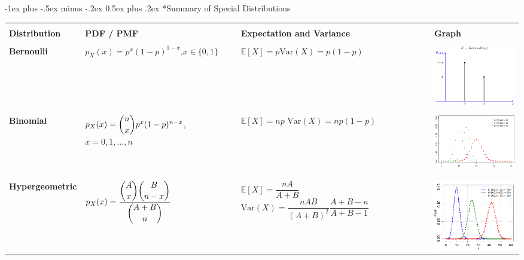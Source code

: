 \documentclass[a4paper,10pt,landscape]{article}
\makeatletter
\newcommand{\var}{\textrm{Var}}
\renewcommand{\section}{\@startsection{section}{1}{0mm}%
                                {-1ex plus -.5ex minus -.2ex}%
                                {0.5ex plus .2ex}%
                                {\normalfont\large\bfseries}}
\makeatother
\begin{document}
\section*{Summary of Special Distributions}
\begin{table}[h!]
	\begin{tabular}{| C{4.5cm} | C{7cm} | C{6cm} | C{7cm} |}
		\hline
		&&&\\
		{\bf Distribution} &
		{\bf PDF / PMF} & {\bf Expectation and Variance} & {\bf Graph} \\ 
		&&&\\ \hline
		{\bf Bernoulli} & $p_X(x)=p^x(1-p)^{1-x}$,\newline \vspace*{3pt}$x\in\{0,1\}$ & $\mathbb{E}[X]=p$\newline \vspace*{3pt}$\var(X)=p(1-p)$ & \includegraphics[width=3.75cm]{bernoulli.png}\\ \hline
		&&&\\
		{\bf Binomial} & $p_X(x)=\dbinom{n}{x}p^x(1-p)^{n-x}$, \newline\vspace*{5pt}$x=0,1,\dots,n$ & $\mathbb{E}[X]=np$ \newline\vspace*{3pt}$\var(X)=np(1-p)$ & \includegraphics[width=3.75cm]{binomial.png}\\
		&&&\\ \hline
		&&&\\
		{\bf Hypergeometric} & $p_X(x)=\dfrac{\dbinom{A}{x}\dbinom{B}{n-x}}{\dbinom{A+B}{n}}$& $\mathbb{E}[X]=\dfrac{nA}{A+B}$ \newline\vspace*{3pt}$\var(X)=\dfrac{nAB}{(A+B)^2}\dfrac{A+B-n}{A+B-1}$ & \includegraphics[width=3.75cm]{hypergeometric.png}\\

\end{tabular}
\end{table}
\end{document}
